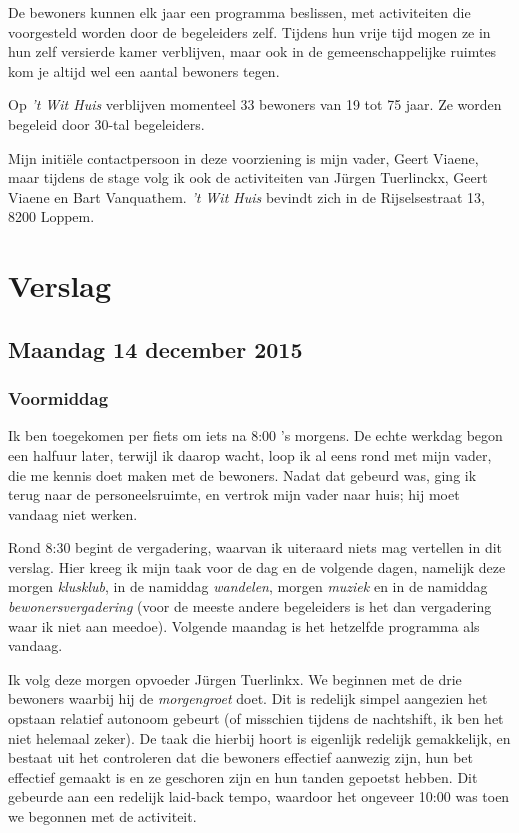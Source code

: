 \documentclass[a4paper,12pt]{article}
\begin{document}
De bewoners kunnen elk jaar een programma beslissen, met activiteiten die voorgesteld worden door de begeleiders zelf. Tijdens hun vrije tijd mogen ze in hun zelf versierde kamer verblijven, maar ook in de gemeenschappelijke ruimtes kom je altijd wel een aantal bewoners tegen.

Op \emph{'t Wit Huis} verblijven momenteel 33 bewoners van 19 tot 75 jaar. Ze worden begeleid door 30-tal begeleiders.

Mijn initiële contactpersoon in deze voorziening is mijn vader, Geert Viaene, maar tijdens de stage volg ik ook de activiteiten van Jürgen Tuerlinckx, Geert Viaene en Bart Vanquathem. \emph{'t Wit Huis} bevindt zich in de Rijselsestraat 13, 8200 Loppem.

\section{Verslag}


\subsection{Maandag 14 december 2015}

\subsubsection{Voormiddag}

Ik ben toegekomen per fiets om iets na 8:00 's morgens. De echte werkdag begon een halfuur later, terwijl ik daarop wacht, loop ik al eens rond met mijn vader, die me kennis doet maken met de bewoners. Nadat dat gebeurd was, ging ik terug naar de personeelsruimte, en vertrok mijn vader naar huis; hij moet vandaag niet werken.

Rond 8:30 begint de vergadering, waarvan ik uiteraard niets mag vertellen in dit verslag. Hier kreeg ik mijn taak voor de dag en de volgende dagen, namelijk deze morgen \emph{klusklub}, in de namiddag \emph{wandelen}, morgen \emph{muziek} en in de namiddag \emph{bewonersvergadering} (voor de meeste andere begeleiders is het dan vergadering waar ik niet aan meedoe). Volgende maandag is het hetzelfde programma als vandaag.

Ik volg deze morgen opvoeder Jürgen Tuerlinkx. We beginnen met de drie bewoners waarbij hij de \emph{morgengroet} doet. Dit is redelijk simpel aangezien het opstaan relatief autonoom gebeurt (of misschien tijdens de nachtshift, ik ben het niet helemaal zeker). De taak die hierbij hoort is eigenlijk redelijk gemakkelijk, en bestaat uit het controleren dat die bewoners effectief aanwezig zijn, hun bet effectief gemaakt is en ze geschoren zijn en hun tanden gepoetst hebben. Dit gebeurde aan een redelijk laid-back tempo, waardoor het ongeveer 10:00 was toen we begonnen met de activiteit.
\end{document}
